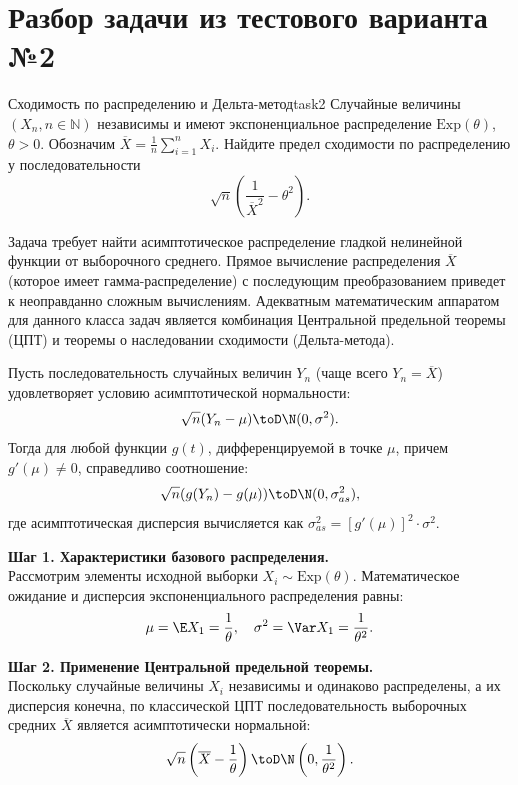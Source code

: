 \section*{Разбор задачи из тестового варианта №2}
\begin{Task}{Сходимость по распределению и Дельта-метод}{task2}
Случайные величины $(X_n, n \in \mathbb{N})$ независимы и имеют экспоненциальное распределение $\text{Exp}(\theta)$, $\theta > 0$. Обозначим $\overline{X} = \frac{1}{n} \sum_{i=1}^n X_i$. Найдите предел сходимости по распределению у последовательности
\[
\sqrt{n} \left( \frac{1}{\overline{X}^2} - \theta^2 \right).
\]
\end{Task}

\begin{Solution}
Задача требует найти асимптотическое распределение гладкой нелинейной функции от выборочного среднего. Прямое вычисление распределения $\overline{X}$ (которое имеет гамма-распределение) с последующим преобразованием приведет к неоправданно сложным вычислениям. Адекватным математическим аппаратом для данного класса задач является комбинация Центральной предельной теоремы (ЦПТ) и теоремы о наследовании сходимости (Дельта-метода).

\begin{MethodBox}
Пусть последовательность случайных величин $Y_n$ (чаще всего $Y_n = \overline{X}$) удовлетворяет условию асимптотической нормальности:
\[
\sqrt{n}(Y_n - \mu) \toD \N(0, \sigma^2).
\]
Тогда для любой функции $g(t)$, дифференцируемой в точке $\mu$, причем $g'(\mu) \neq 0$, справедливо соотношение:
\[
\sqrt{n}(g(Y_n) - g(\mu)) \toD \N(0, \sigma_{as}^2),
\]
где асимптотическая дисперсия вычисляется как $\sigma_{as}^2 = [g'(\mu)]^2 \cdot \sigma^2$.
\end{MethodBox}

\textbf{Шаг 1. Характеристики базового распределения.}\\
Рассмотрим элементы исходной выборки $X_i \sim \text{Exp}(\theta)$. Математическое ожидание и дисперсия экспоненциального распределения равны:
\[
\mu = \E X_1 = \frac{1}{\theta}, \quad \sigma^2 = \Var X_1 = \frac{1}{\theta^2}.
\]

\textbf{Шаг 2. Применение Центральной предельной теоремы.}\\
Поскольку случайные величины $X_i$ независимы и одинаково распределены, а их дисперсия конечна, по классической ЦПТ последовательность выборочных средних $\overline{X}$ является асимптотически нормальной:
\[
\sqrt{n} \left( \overline{X} - \frac{1}{\theta} \right) \toD \N\left(0, \frac{1}{\theta^2}\right).
\]


\end{Solution}
